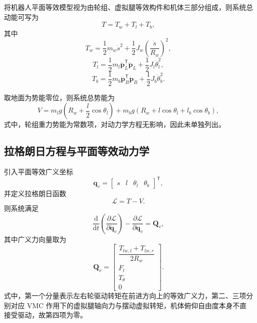 将机器人平面等效模型视为由轮组、虚拟腿等效构件和机体三部分组成，则系统总动能可写为
\begin{equation}
  T = T_w + T_l + T_b,
  \label{eq:kinetic-total}
\end{equation}
其中
\begin{equation}
  T_w = \frac{1}{2}m_w\dot{s}^2 + \frac{1}{2}J_w\left(\frac{\dot{s}}{R_w}\right)^2,
  \label{eq:kinetic-wheel}
\end{equation}
\begin{equation}
  T_l = \frac{1}{2}m_l \dot{\boldsymbol{p}}_L^\mathsf{T}\dot{\boldsymbol{p}}_L + \frac{1}{2}J_l\dot{\theta}_l^2,
  \label{eq:kinetic-leg}
\end{equation}
\begin{equation}
  T_b = \frac{1}{2}m_b \dot{\boldsymbol{p}}_B^\mathsf{T}\dot{\boldsymbol{p}}_B + \frac{1}{2}J_b\dot{\theta}_b^2.
  \label{eq:kinetic-body}
\end{equation}

取地面为势能零位，则系统总势能为
\begin{equation}
  V = m_l g\left(R_w + \frac{l}{2}\cos\theta_l\right) + m_b g\left(R_w + l\cos\theta_l + l_b\cos\theta_b\right),
  \label{eq:potential-total}
\end{equation}
式中，轮组重力势能为常数项，对动力学方程无影响，因此未单独列出。

\subsection{拉格朗日方程与平面等效动力学}

引入平面等效广义坐标
\begin{equation}
  \boldsymbol{q}_v =
  \begin{bmatrix}
    s & l & \theta_l & \theta_b
  \end{bmatrix}^{\mathsf{T}},
  \label{eq:generalized-coordinate-v}
\end{equation}
并定义拉格朗日函数
\begin{equation}
  \mathcal{L} = T - V.
  \label{eq:lagrangian}
\end{equation}
则系统满足
\begin{equation}
  \frac{\mathrm{d}}{\mathrm{d}t}\left(\frac{\partial \mathcal{L}}{\partial \dot{\boldsymbol{q}}_v}\right)
  -
  \frac{\partial \mathcal{L}}{\partial \boldsymbol{q}_v}
  = \boldsymbol{Q}_v,
  \label{eq:lagrange-equation}
\end{equation}
其中广义力向量取为
\begin{equation}
  \boldsymbol{Q}_v =
  \begin{bmatrix}
    \dfrac{T_{lw,l} + T_{lw,r}}{2R_w} \\
    F_l \\
    T_\theta \\
    0
  \end{bmatrix}.
  \label{eq:generalized-force}
\end{equation}
式中，第一个分量表示左右轮驱动转矩在前进方向上的等效广义力，第二、三项分别对应 VMC 作用下的虚拟腿轴向力与摆动虚拟转矩，机体俯仰自由度本身不直接受驱动，故第四项为零。

